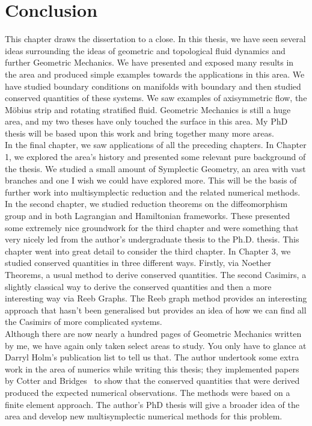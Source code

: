 
\chapter{Conclusion}

This chapter draws the dissertation to a close. In this thesis, we have seen several ideas surrounding the ideas of geometric and topological fluid dynamics and further Geometric Mechanics. We have presented and exposed many results in the area and produced simple examples towards the applications in this area. We have studied boundary conditions on manifolds with boundary and then studied conserved quantities of these systems. We saw examples of axisymmetric flow, the M\"obius strip and rotating stratified fluid. Geometric Mechanics is still a huge area, and my two theses have only touched the surface in this area. My PhD thesis will be based upon this work and bring together many more areas.\\

\noindent
In the final chapter, we saw applications of all the preceding chapters. In Chapter 1, we explored the area's history and presented some relevant pure background of the thesis. We studied a small amount of Symplectic Geometry, an area with vast branches and one I wish we could have explored more. This will be the basis of further work into multisymplectic reduction and the related numerical methods. In the second chapter, we studied reduction theorems on the diffeomorphism group and in both Lagrangian and Hamiltonian frameworks. These presented some extremely nice groundwork for the third chapter and were something that very nicely led from the author's undergraduate thesis to the Ph.D. thesis. This chapter went into great detail to consider the third chapter. In Chapter 3, we studied conserved quantities in three different ways. Firstly, via Noether Theorems, a usual method to derive conserved quantities. The second Casimirs, a slightly classical way to derive the conserved quantities and then a more interesting way via Reeb Graphs. The Reeb graph method provides an interesting approach that hasn't been generalised but provides an idea of how we can find all the Casimirs of more complicated systems.\\

\noindent
Although there are now nearly a hundred pages of Geometric Mechanics written by me, we have again only taken select areas to study. You only have to glance at Darryl Holm's publication list to tell us that. The author undertook some extra work in the area of numerics while writing this thesis; they implemented papers by Cotter and Bridges~\cite{cotter2005general,hamil_pdes} to show that the conserved quantities that were derived produced the expected numerical observations. The methods were based on a finite element approach. The author's PhD thesis will give a broader idea of the area and develop new multisymplectic numerical methods for this problem.\\

